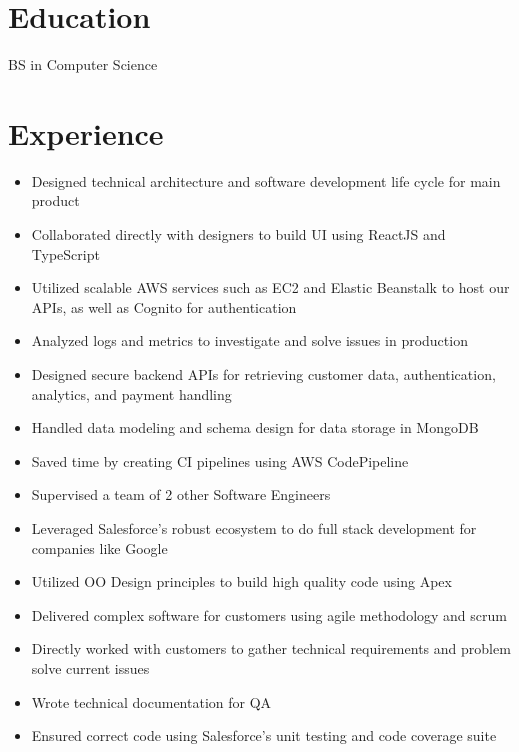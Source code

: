 \documentclass{cv}
\begin{document}
	\section{Education}
	BS in Computer Science

	\section{Experience}
	\begin{itemize}
		\item Designed technical architecture and software development life cycle for main product
		\item Collaborated directly with designers to build UI using ReactJS and TypeScript
		\item Utilized scalable AWS services such as EC2 and Elastic Beanstalk to host our APIs, as well as Cognito for authentication
		\item Analyzed logs and metrics to investigate and solve issues in production
		\item Designed secure backend APIs for retrieving customer data, authentication, analytics, and payment handling
		\item Handled data modeling and schema design for data storage in MongoDB
		\item Saved time by creating CI pipelines using AWS CodePipeline
		\item Supervised a team of 2 other Software Engineers
	\end{itemize}

	\begin{itemize}
		\item Leveraged Salesforce's robust ecosystem to do full stack development for companies like Google
		\item Utilized OO Design principles to build high quality code using Apex
		\item Delivered complex software for customers using agile methodology and scrum
		\item Directly worked with customers to gather technical requirements and problem solve current issues
		\item Wrote technical documentation for QA
		\item Ensured correct code using Salesforce's unit testing and code coverage suite
	\end{itemize}
\end{document}
